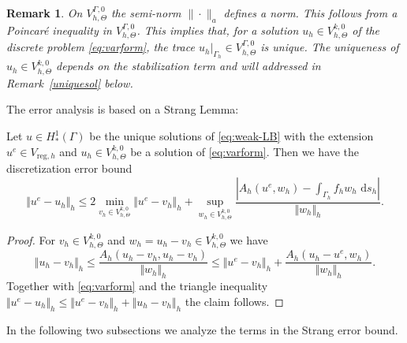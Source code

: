 \documentclass[final]{siamltex}
\newtheorem{remark}{Remark}
\begin{document}
\begin{remark} \rm 
On ${V_{h,\Theta}^{\Gamma,0}}$ the semi-norm $\|\cdot\|_a$ defines a norm. This follows from a Poincar{\'e} inequality in ${V_{h,\Theta}^{\Gamma,0}}$. This implies that, for a solution $u_h\in{V_{h,\Theta}^{k,0}}$ of the discrete problem \eqref{eq:varform}, the trace $u_h|_{\Gamma_h}\in {V_{h,\Theta}^{\Gamma,0}}$ is unique. The uniqueness of $u_h\in{V_{h,\Theta}^{k,0}}$ depends on the stabilization term and will addressed in Remark~\ref{uniquesol} below.
\end{remark}

The error analysis is based on a Strang Lemma:
\begin{lemma} \label{Strang} Let $u \in H^1_\ast(\Gamma)$ be the unique solutions of \eqref{eq:weak-LB} with the extension $u^e \in {V_{\text{reg},h}}$ and $u_h \in {V_{h,\Theta}^{k,0}}$ be a solution of \eqref{eq:varform}. Then we have the discretization error bound
\begin{equation} \label{Strangbound}
 {\Vert {u^e-u_h} \Vert_h} \leq 2 \min_{v_h \in {V_{h,\Theta}^{k,0}}} {\Vert {u^e - v_h} \Vert_h} + \sup_{w_h \in {V_{h,\Theta}^{k,0}}} \frac{|A_h(u^e,w_h)-\int_{\Gamma_h} f_h w_h \, {\,\mathrm{d} {s_h}}|}{{\Vert {w_h} \Vert_h}}.
\end{equation}
\end{lemma}
\begin{proof}
For $v_h \in {V_{h,\Theta}^{k,0}}$ and $w_h = u_h - v_h \in {V_{h,\Theta}^{k,0}}$ we have 
\[
 \Vert u_h - v_h \Vert_h \leq \frac{A_h(u_h-v_h,u_h-v_h)}{\Vert w_h \Vert_h} \leq \Vert u^e - v_h \Vert_h + \frac{A_h(u_h-u^e,w_h)}{\Vert w_h \Vert_h}.
\]
Together with \eqref{eq:varform} and the triangle inequality
$
{\Vert {u^e - u_h} \Vert_h} \leq {\Vert {u^e - v_h} \Vert_h} + {\Vert {u_h - v_h} \Vert_h}
$ the claim follows.
\end{proof}

In the following two subsections we analyze the terms in the Strang error bound.
\end{document}
